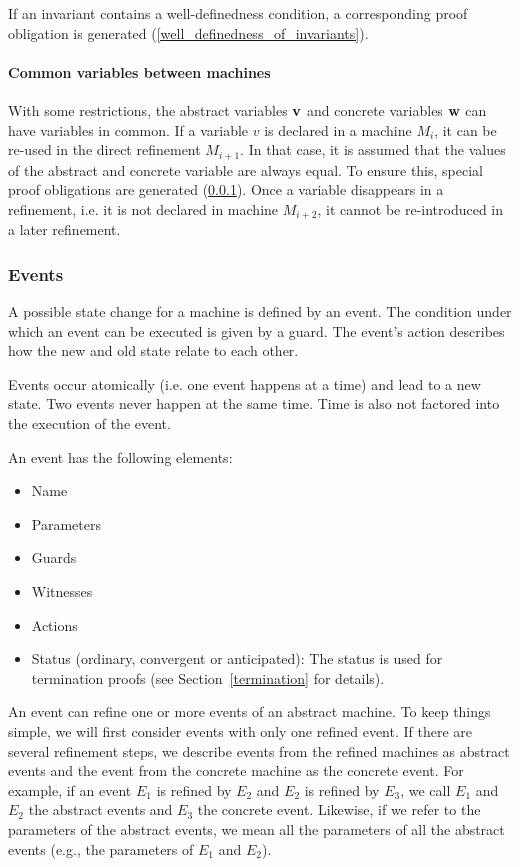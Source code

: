 If an invariant contains a well-definedness condition, 
  a corresponding proof obligation is generated (\ref{well_definedness_of_invariants}).

\paragraph{Common variables between machines}
\label{common_variables}
With some restrictions, the abstract variables $\mathbf{v}$ and concrete
  variables $\mathbf{w}$ can have variables in common.
If a variable $v$ is declared in a machine $M_i$, it can be re-used in the
  direct refinement $M_{i+1}$. 
In that case, it is assumed that the values of the abstract and concrete variable 
  are always equal.
To ensure this, special proof obligations are generated (\ref{events}).
Once a variable disappears in a refinement, i.e. it is not declared in machine $M_{i+2}$,
  it cannot be re-introduced in a later refinement.

\subsubsection{Events}
\label{events}
A possible state change for a machine is defined by an event.
The condition under which an event can be executed is given by a guard. The event's action
describes how the new and old state relate to each other.

Events occur atomically (i.e. one event happens at a time) and lead to a new state.
Two events never happen at the same time. Time is also not factored into the execution of the event.

An event has the following elements:
\begin{itemize}
\item Name
\item Parameters
\item Guards
\item Witnesses
\item Actions
\item Status (ordinary, convergent or anticipated): The status is used
  for termination proofs (see Section~\ref{termination} for details).
\end{itemize}

An event can refine one or more events of an abstract machine. To keep things simple, we will
  first consider events with only one refined event.
If there are several refinement steps, we describe events from the refined machines as abstract events and the event from the concrete machine as the concrete event. For example, if an event $E_1$ is refined by $E_2$ and $E_2$ is refined by
  $E_3$, we call $E_1$ and $E_2$ the abstract events and $E_3$ the concrete event.
Likewise, if we refer to the parameters of the abstract events, we mean all the parameters
  of all the abstract events (e.g., the parameters of $E_1$ and $E_2$).

